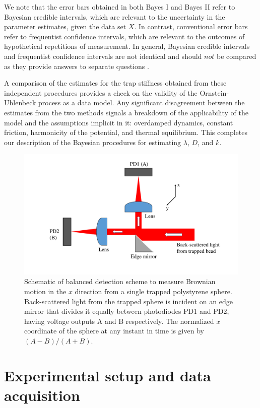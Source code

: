 \documentclass[english,aps, twocolumn, pre,superscriptaddress]{revtex4-1}
\begin{document}
We note that the error bars obtained in both Bayes I and Bayes II
refer to Bayesian credible intervals, which are relevant to the uncertainty
in the parameter estimates, given the data set $X$. In contrast,
conventional error bars refer to frequentist confidence intervals,
which are relevant to the outcomes of hypothetical repetitions of
measurement. In general, Bayesian credible intervals and frequentist
confidence intervals are not identical and should $not$ be compared
as they provide answers to separate questions \cite{jaynes1976confidence}. 

A comparison of the estimates for the trap stiffness obtained from
these independent procedures provides a check on the validity of the
Ornstein-Uhlenbeck process as a data model. Any significant disagreement
between the estimates from the two methods signals a breakdown of
the applicability of the model and the assumptions implicit in it:
overdamped dynamics, constant friction, harmonicity of the potential,
and thermal equilibrium. This completes our description of the Bayesian
procedures for estimating $\lambda$, $D$, and $k$. 
\begin{figure}[t]
\hfill{}\includegraphics[scale=0.3]{figure1}\hfill{}\caption{Schematic of balanced detection scheme to measure Brownian motion
in the $x$ direction from a single trapped polystyrene sphere. Back-scattered
light from the trapped sphere is incident on an edge mirror that divides
it equally between photodiodes PD1 and PD2, having voltage outputs
A and B respectively. The normalized $x$ coordinate of the sphere
at any instant in time is given by $(A-B)/(A+B).$\label{fig:balanced-detection}}
\end{figure}


\section{Experimental setup and data acquisition\label{sec:Experimental-setup-and}}
\end{document}
